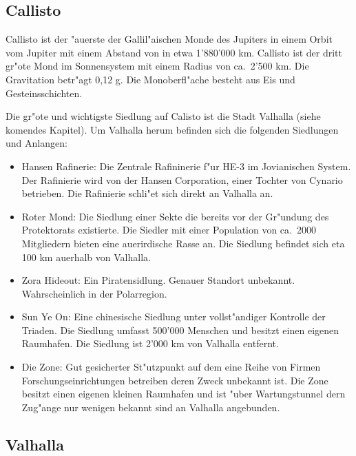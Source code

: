 \subsection{Callisto}

Callisto ist der "au\3erste der Gallil"aischen Monde des Jupiters in einem Orbit vom Jupiter mit einem Abstand von in
etwa 1'880'000 km. Callisto ist der dritt gr"o\3te Mond im Sonnensystem mit einem Radius von ca.~2'500 km. Die
Gravitation betr"agt 0,12 g. Die Monoberfl"ache besteht aus Eis und Gesteinsschichten.

Die gr"o\3te und wichtigste Siedlung auf Calisto ist die Stadt Valhalla (siehe komendes Kapitel). Um Valhalla herum befinden
sich die folgenden Siedlungen und Anlangen:

\begin{itemize}
    \item Hansen Rafinerie: Die Zentrale Rafininerie f"ur HE-3 im Jovianischen System. Der Rafinierie wird von der Hansen 
    Corporation, einer Tochter von Cynario betrieben. Die Rafinierie schli"e\3t sich direkt an Valhalla an.
    \item Roter Mond: Die Siedlung einer Sekte die bereits vor der Gr"undung des Protektorats existierte. Die Siedler mit einer Population von ca.~2000 Mitgliedern bieten eine au\3erirdische Rasse an. Die Siedlung befindet sich eta 100 km au\3erhalb von Valhalla.
    \item Zora Hideout: Ein Piratensidlung. Genauer Standort unbekannt. Wahrscheinlich in der Polarregion.
    \item Sun Ye On: Eine chinesische Siedlung unter vollst"andiger Kontrolle der Triaden. Die Siedlung umfasst 500'000 Menschen und besitzt einen eigenen Raumhafen. Die Siedlung ist 2'000 km von Valhalla entfernt.
    \item Die Zone: Gut gesicherter St"utzpunkt auf dem eine Reihe von Firmen Forschungseinrichtungen betreiben deren Zweck unbekannt ist. Die Zone besitzt einen eigenen kleinen Raumhafen und ist "uber Wartungstunnel dern Zug"ange nur wenigen bekannt sind an Valhalla angebunden.
\end{itemize}

\subsection{Valhalla}

